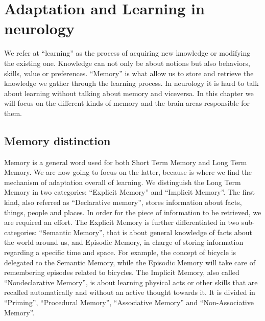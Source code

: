 \documentclass[conference]{IEEEtran}
\begin{document}
\section{Adaptation and Learning in neurology}
	We refer at ``learning'' as the process of acquiring new knowledge or modifying the existing one. Knowledge can not only be about notions but also behaviors, skills, value or preferences.\cite{b7}
	``Memory'' is what allow us to store and retrieve the knowledge we gather through the learning process.
	In neurology it is hard to talk about learning without talking about memory and viceversa. In this chapter we will focus on the different kinds of memory and the brain areas responsible for them.

	\subsection{Memory distinction}\label{MD}
		Memory is a general word used for both Short Term Memory and Long Term Memory. We are now going to focus on the latter, because is where we find the mechanism of adaptation overall of learning.
		We distinguish the Long Term Memory in two categories: ``Explicit Memory'' and ``Implicit Memory''.
		The first kind, also referred as ``Declarative memory'',  stores information about facts, things, people and places. In order for the piece of information to be retrieved, we are required an effort.
		The Explicit Memory is further differentiated in two sub-categories: ``Semantic Memory'', that is about general knowledge of facts about the world around us, and Episodic Memory, in charge of storing information regarding a specific time and space.
		For example, the concept of bicycle is delegated to the Semantic Memory, while the Episodic Memory will take care of remembering episodes related to bicycles.
		The Implicit Memory, also called ``Nondeclarative Memory'', is about learning physical acts or other skills that are recalled automatically and without an active thought towards it.
		It is divided in ``Priming'', ``Procedural Memory'', ``Associative Memory'' and ``Non-Associative Memory''.
\end{document}
